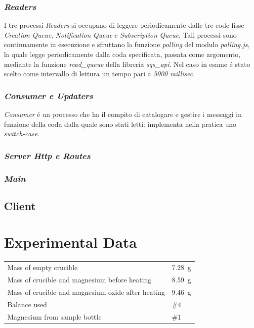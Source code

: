 \documentclass{article}
\begin{document}
\subsubsection{\textit{Readers}}
I tre processi \textit{Readers} si occupano di leggere periodicamente dalle tre code fisse \textit{Creation Queue}, \textit{Notification Queue} e \textit{Subscription Queue}. Tali processi sono continuamente in esecuzione e sfruttano la funzione \textit{polling} del modulo \textit{polling.js}, la quale legge periodicamente dalla coda specificata, passata come argomento, mediante la funzione \textit{read\_queue} della libreria \textit{sqs\_api}. Nel caso in esame \'e stato scelto come intervallo di lettura un tempo pari a \textit{5000 millisec}.

\subsubsection{\textit{Consumer e Updaters}}
\textit{Consumer} \'e un processo che ha il compito di catalogare e gestire i messaggi in funzione della coda dalla quale sono stati letti: implementa nella pratica uno \textit{switch-case}. 


\subsubsection{\textit{Server Http e Routes}}

\subsubsection{\textit{Main}}

\subsection{Client}
 

\section{Experimental Data}

\begin{tabular}{ll}
Mass of empty crucible & \SI{7.28}{\gram}\\
Mass of crucible and magnesium before heating & \SI{8.59}{\gram}\\
Mass of crucible and magnesium oxide after heating & \SI{9.46}{\gram}\\
Balance used & \#4\\
Magnesium from sample bottle & \#1
\end{tabular}
\end{document}
